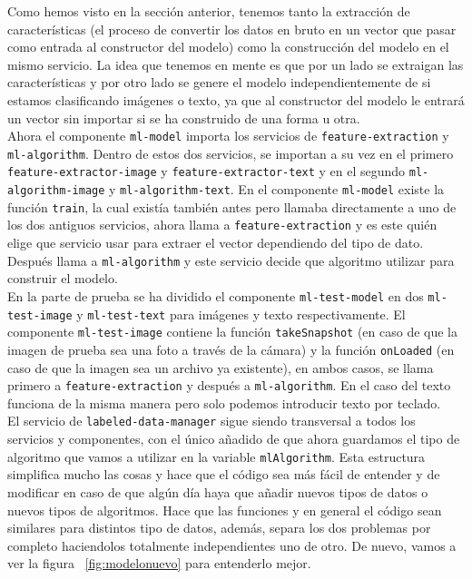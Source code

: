 \documentclass[a4paper, 12pt]{book}
\begin{document}
Como hemos visto en la sección anterior, tenemos tanto la extracción de características (el proceso de convertir los datos en bruto en un vector que pasar como entrada al constructor del modelo) como la construcción del modelo en el mismo servicio. La idea que tenemos en mente es que por un lado se extraigan las características y por otro lado se genere el modelo independientemente de si estamos clasificando imágenes o texto, ya que al constructor del modelo le entrará un vector sin importar si se ha construido de una forma u otra.\\
Ahora el componente \texttt{ml-model} importa los servicios de \texttt{feature-extraction} y \texttt{ml-algorithm}. Dentro de estos dos servicios, se importan a su vez en el primero \texttt{feature-extractor-image} y \texttt{feature-extractor-text} y en el segundo \texttt{ml-algorithm-image} y \texttt{ml-algorithm-text}.
En el componente \texttt{ml-model} existe la función \texttt{train}, la cual existía también antes pero llamaba directamente a uno de los dos antiguos servicios, ahora llama a \texttt{feature-extraction} y es este quién elige que servicio usar para extraer el vector dependiendo del tipo de dato. Después llama a \texttt{ml-algorithm} y este servicio decide que algoritmo utilizar para construir el modelo.\\
En la parte de prueba se ha dividido el componente \texttt{ml-test-model} en dos \texttt{ml-test-image} y \texttt{ml-test-text} para imágenes y texto respectivamente. El componente \texttt{ml-test-image} contiene la función \texttt{takeSnapshot} (en caso de que la imagen de prueba sea una foto a través de la cámara) y la función \texttt{onLoaded} (en caso de que la imagen sea un archivo ya existente), en ambos casos, se llama primero a \texttt{feature-extraction} y después a \texttt{ml-algorithm}. En el caso del texto funciona de la misma manera pero solo podemos introducir texto por teclado.\\
El servicio de \texttt{labeled-data-manager} sigue siendo transversal a todos los servicios y componentes, con el único añadido de que ahora guardamos el tipo de algoritmo que vamos a utilizar en la variable \texttt{mlAlgorithm}.
Esta estructura simplifica mucho las cosas y hace que el código sea más fácil de entender y de modificar en caso de que algún día haya que añadir nuevos tipos de datos o nuevos tipos de algoritmos. Hace que las funciones y en general el código sean similares para distintos tipo de datos, además, separa los dos problemas por completo haciendolos totalmente independientes uno de otro. De nuevo, vamos a ver la figura ~\ref{fig:modelonuevo} para entenderlo mejor.
\end{document}
